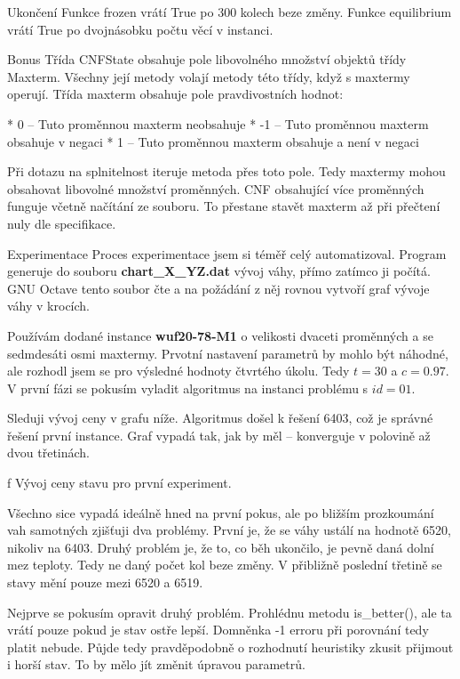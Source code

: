 \secc Ukončení
Funkce frozen vrátí True po 300 kolech beze změny. Funkce equilibrium vrátí True po dvojnásobku počtu věcí v instanci.

\secc Bonus
Třída CNFState obsahuje pole libovolného množství objektů třídy Maxterm. Všechny její metody volají metody této třídy, když s maxtermy operují. Třída maxterm obsahuje pole pravdivostních hodnot:

\begitems
* 0 -- Tuto proměnnou maxterm neobsahuje
* -1 -- Tuto proměnnou maxterm obsahuje v negaci
* 1 -- Tuto proměnnou maxterm obsahuje a není v negaci
\enditems

Při dotazu na splnitelnost iteruje metoda přes toto pole. Tedy maxtermy mohou obsahovat libovolné množství proměnných. CNF obsahující více proměnných funguje včetně načítání ze souboru. To přestane stavět maxterm až při přečtení nuly dle specifikace.

\vfill\break
\sec Experimentace
Proces experimentace jsem si téměř celý automatizoval. Program generuje do souboru {\bf chart\_X\_YZ.dat} vývoj váhy, přímo zatímco ji počítá. GNU Octave tento soubor čte a na požádání z něj rovnou vytvoří graf vývoje váhy v krocích.

Používám dodané instance {\bf wuf20-78-M1} o velikosti dvaceti proměnných a se sedmdesáti osmi maxtermy. Prvotní nastavení parametrů by mohlo být náhodné, ale rozhodl jsem se pro výsledné hodnoty čtvrtého úkolu. Tedy  $t = 30$ a $c = 0.97$. V první fázi se pokusím vyladit algoritmus na instanci problému s $id=01$.

Sleduji vývoj ceny v grafu níže. Algoritmus došel k řešení 6403, což je správné řešení první instance. Graf vypadá tak, jak by měl -- konverguje v polovině až dvou třetinách.



\centerline{ \picwidth=17cm  }
\caption/f Vývoj ceny stavu pro první experiment.
\bigskip

Všechno sice vypadá ideálně hned na první pokus, ale po bližším prozkoumání vah samotných zjišťuji dva problémy. První je, že se váhy ustálí na hodnotě 6520, nikoliv na 6403. Druhý problém je, že to, co běh ukončilo, je pevně daná dolní mez teploty. Tedy ne daný počet kol beze změny. V přibližně poslední třetině se stavy mění pouze mezi 6520 a 6519.

Nejprve se pokusím opravit druhý problém. Prohlédnu metodu is\_better(), ale ta vrátí  pouze pokud je stav ostře lepší. Domněnka -1 erroru při porovnání tedy platit nebude. Půjde tedy pravděpodobně o rozhodnutí heuristiky zkusit přijmout i horší stav. To by mělo jít změnit úpravou parametrů.

